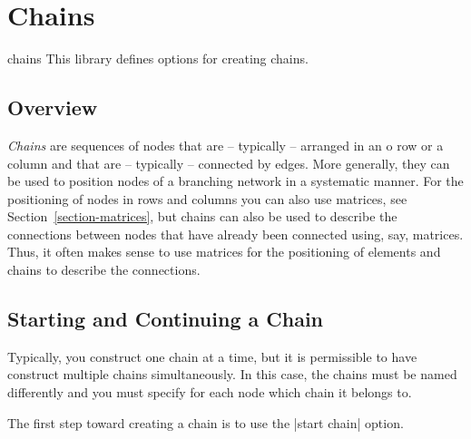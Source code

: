 %
%
%


\section{Chains}

\label{section-chains}

\begin{tikzlibrary}{chains}
  This library defines options for creating chains.
\end{tikzlibrary}


\subsection{Overview}

\emph{Chains} are sequences of nodes that are -- typically -- arranged
in an o row or a column and that are -- typically -- connected by
edges. More generally, they can be used to position nodes of a
branching network in a systematic manner. For the positioning of nodes
in rows and columns you can also use matrices, see
Section~\ref{section-matrices}, but chains can also be used
to describe the connections between nodes that have already been
connected using, say, matrices. Thus, it often makes sense to use
matrices for the positioning of elements and chains to describe the
connections.



\subsection{Starting and Continuing a Chain}

Typically, you construct one chain at a time, but it is
permissible to have construct multiple chains simultaneously. In this
case, the chains must be named differently and you must specify for
each node which chain it belongs to.

The first step toward creating a chain is to use the |start chain|
option.

